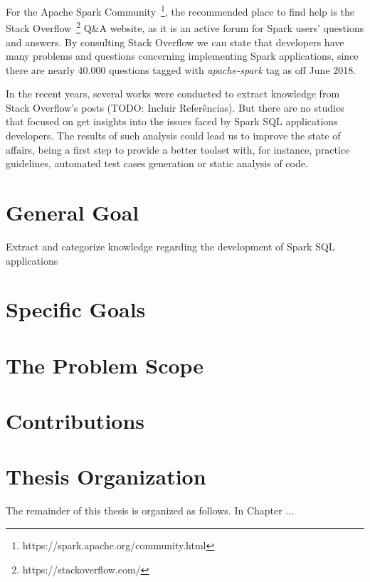 For the Apache Spark Community~\footnote{https://spark.apache.org/community.html}, the recommended place to find help is the Stack Overflow~\footnote{https://stackoverflow.com/} Q\&A website, as it is an active forum for Spark users’ questions and answers. By consulting Stack Overflow we can state that developers have many problems and questions concerning implementing Spark applications, since there are nearly 40.000 questions tagged with \emph{apache-spark} tag as off June 2018.

In the recent years, several works were conducted  to extract knowledge from Stack Overflow's posts (TODO: Incluir Referências). But there are no studies that focused on get insights into the issues faced by Spark SQL applications developers. The results of such analysis could lead us to improve the state of affairs, being a first step to provide a better toolset with, for instance, practice guidelines, automated test cases generation or static analysis of code.

\section{General Goal}

Extract and categorize knowledge regarding the development of Spark SQL applications 

\section{Specific Goals}

\section{The Problem Scope}

\section{Contributions}

\section{Thesis Organization}

The remainder of this thesis is organized as follows. In Chapter ...